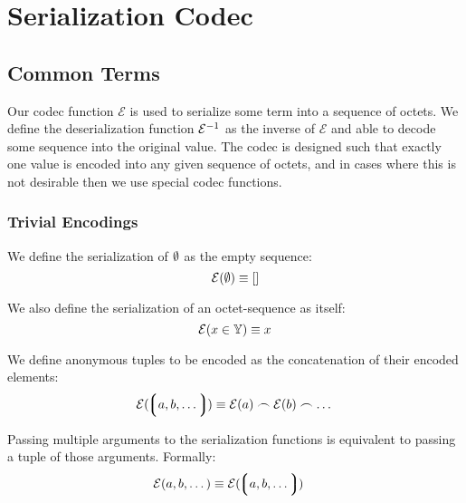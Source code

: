 \section{Serialization Codec}\label{sec:serialization}

\subsection{Common Terms}

Our codec function $\mathcal{E}$ is used to serialize some term into a sequence of octets. We define the deserialization function $\mathcal{E}^{-1}$ as the inverse of $\mathcal{E}$ and able to decode some sequence into the original value. The codec is designed such that exactly one value is encoded into any given sequence of octets, and in cases where this is not desirable then we use special codec functions.

\subsubsection{Trivial Encodings}
We define the serialization of $\emptyset$ as the empty sequence:
\begin{equation}
  \mathcal{E}(\emptyset) \equiv []
\end{equation}

We also define the serialization of an octet-sequence as itself:
\begin{equation}
  \mathcal{E}(x \in \mathbb{Y}) \equiv x
\end{equation}

We define anonymous tuples to be encoded as the concatenation of their encoded elements:
\begin{equation}
  \se(\tup{a, b, \dots}) \equiv \se(a) \concat \se(b) \concat \dots
\end{equation}

Passing multiple arguments to the serialization functions is equivalent to passing a tuple of those arguments. Formally:
\begin{align}
  \se(a, b, \dots) &\equiv \se(\tup{a, b, \dots})
\end{align}


